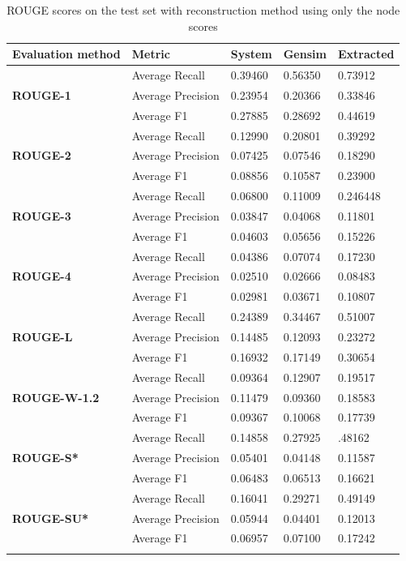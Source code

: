 \begin{longtable}{| l | l | l | l | l |}
	\hline
	\textbf{Evaluation method}&\textbf{Metric}&\textbf{System}&\textbf{Gensim}&\textbf{Extracted}\\ \hline \hline		
	\multirow{3}{*}{\textbf{ROUGE-1}}
	&Average Recall&0.39460&0.56350&0.73912 \\
	&Average Precision&0.23954&0.20366&0.33846 \\ 
	&Average F1&0.27885&0.28692&0.44619 \\ \hline \hline
	\multirow{3}{*}{\textbf{ROUGE-2}}
	&Average Recall&0.12990&0.20801&0.39292 \\
	&Average Precision&0.07425&0.07546&0.18290 \\
	&Average F1&0.08856&0.10587&0.23900 \\ \hline \hline
	\multirow{3}{*}{\textbf{ROUGE-3}}
	&Average Recall&0.06800&0.11009&0.246448 \\
	&Average Precision&0.03847&0.04068&0.11801 \\
	&Average F1&0.04603&0.05656&0.15226 \\ \hline \hline
	\multirow{3}{*}{\textbf{ROUGE-4}}
	&Average Recall&0.04386&0.07074&0.17230 \\
	&Average Precision&0.02510&0.02666&0.08483 \\
	&Average F1&0.02981&0.03671&0.10807 \\ \hline \hline
	\multirow{3}{*}{\textbf{ROUGE-L}}
	&Average Recall&0.24389&0.34467&0.51007 \\
	&Average Precision&0.14485&0.12093&0.23272 \\
	&Average F1&0.16932&0.17149&0.30654 \\ \hline \hline
	\multirow{3}{*}{\textbf{ROUGE-W-1.2}}
	&Average Recall&0.09364&0.12907&0.19517 \\
	&Average Precision&0.11479&0.09360&0.18583 \\
	&Average F1&0.09367&0.10068&0.17739 \\ \hline \hline
	\multirow{3}{*}{\textbf{ROUGE-S*}}
	&Average Recall&0.14858&0.27925&.48162 \\
	&Average Precision&0.05401&0.04148&0.11587 \\
	&Average F1&0.06483&0.06513&0.16621 \\ \hline \hline
	\multirow{3}{*}{\textbf{ROUGE-SU*}}
	&Average Recall&0.16041&0.29271&0.49149 \\
	&Average Precision&0.05944&0.04401&0.12013 \\
	&Average F1&0.06957&0.07100&0.17242 \\ \hline
	\caption{ROUGE scores on the test set with reconstruction method using only the node scores}
\end{longtable}

